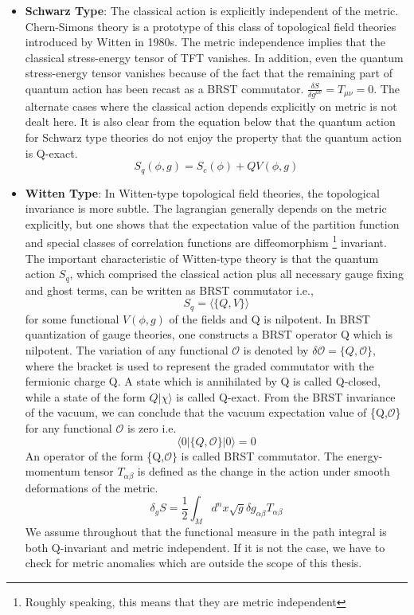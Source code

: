\begin{itemize} 
\item \textbf{Schwarz Type}: The classical action is explicitly independent of the metric. Chern-Simons theory is a 
prototype of this class of topological field theories introduced by Witten in 1980s. The metric independence implies 
that the classical stress-energy tensor of TFT vanishes. In addition, even the quantum stress-energy tensor vanishes 
because of the fact that the remaining part of quantum action has been recast as a BRST commutator.  
$ \frac{\delta S}{\delta g^{\mu\nu}} = T_{\mu\nu} = 0 $. The alternate cases where the classical action depends 
explicitly on metric is not dealt here. It is also clear from the equation below that the quantum action for Schwarz 
type theories do not enjoy the property that the quantum action is Q-exact. 
\begin{equation}
S_{q}(\phi, g) = S_{c}(\phi) + QV(\phi,g) 
\end{equation}
\item \textbf{Witten Type}: In Witten-type topological field theories, the topological invariance is more subtle. 
The lagrangian generally depends on the metric explicitly, but one shows that the expectation value of the 
partition function and special classes of correlation functions are diffeomorphism 
\footnote{Roughly speaking, this means that they are metric independent} invariant. 
The important characteristic of Witten-type theory is that the quantum action $S_{q}$, 
which comprised the classical action plus all necessary gauge fixing and ghost terms, 
can be written as BRST commutator i.e.,
\begin{equation}
S_{q} = \langle \{Q, V\}\rangle 
\end{equation}
for some functional $V(\phi,g)$ of the fields and Q is nilpotent. 
In BRST quantization of gauge theories, one constructs a BRST operator Q which is nilpotent. 
The variation of any functional $\mathcal{O}$ is denoted by $
\delta\mathcal{O} = \{Q,\mathcal{O}\} $, where the bracket is used to represent the graded commutator 
with the fermionic charge Q. A state which is annihilated by Q is called Q-closed, while a state of the 
form $ Q|\chi\rangle$ is called Q-exact. From the BRST invariance of the vacuum, we can conclude 
that the vacuum expectation value of \{Q,$\mathcal{O}$\} for any functional $\mathcal{O}$ is zero i.e. 
\begin{equation}
 \langle 0 | \{Q,\mathcal{O}\} | 0 \rangle  = 0 
 \end{equation}
An operator of the form \{Q,$\mathcal{O}\}$ is called BRST commutator. The energy-momentum tensor 
$T_{\alpha\beta}$ is defined as the change in the action under smooth deformations of the metric.
\begin{equation}
\delta_{g} S = \frac{1}{2} \int_{M} d^{n} x \sqrt{g} \delta g_{\alpha\beta} T_{\alpha\beta}
\end{equation}
We assume throughout that the functional measure in the path integral is both Q-invariant and metric
independent. If it is not the case, we have to check for metric anomalies which are outside the scope of this thesis. 
\end{itemize} 


